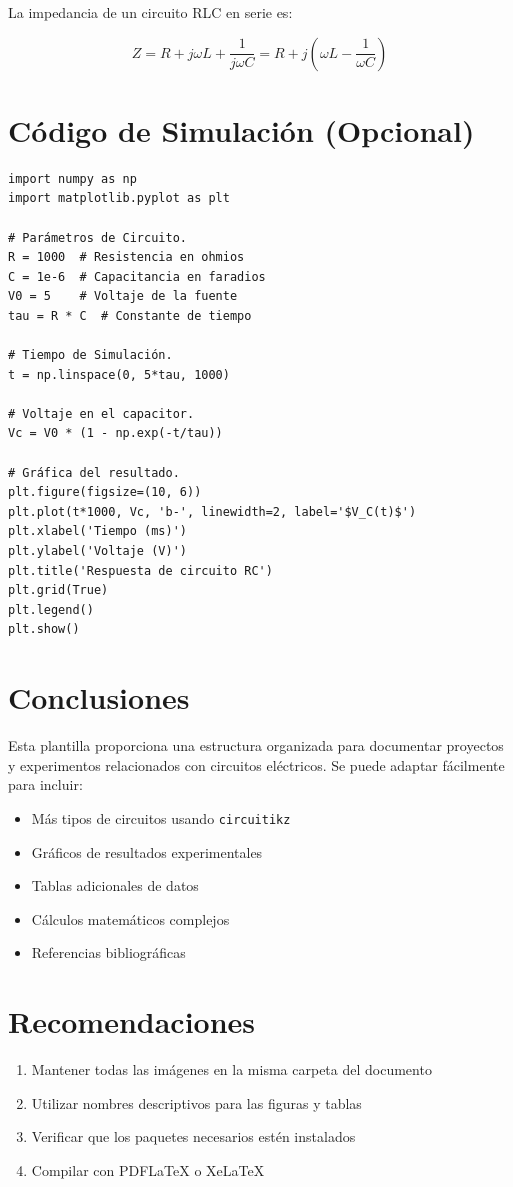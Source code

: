 \documentclass[a4paper, 12pt]{article}
\begin{document}
La impedancia de un circuito RLC en serie es:

\[
Z = R + j\omega L + \frac{1}{j\omega C} = R + j\left(\omega L - \frac{1}{\omega C}\right)
\]

\section{Código de Simulación (Opcional)}

\begin{lstlisting}[caption={Código Python para simulación de circuito RC}, label=lst:simulacion]
import numpy as np
import matplotlib.pyplot as plt

# Parámetros de Circuito.
R = 1000  # Resistencia en ohmios
C = 1e-6  # Capacitancia en faradios
V0 = 5    # Voltaje de la fuente
tau = R * C  # Constante de tiempo

# Tiempo de Simulación.
t = np.linspace(0, 5*tau, 1000)

# Voltaje en el capacitor.
Vc = V0 * (1 - np.exp(-t/tau))

# Gráfica del resultado.
plt.figure(figsize=(10, 6))
plt.plot(t*1000, Vc, 'b-', linewidth=2, label='$V_C(t)$')
plt.xlabel('Tiempo (ms)')
plt.ylabel('Voltaje (V)')
plt.title('Respuesta de circuito RC')
plt.grid(True)
plt.legend()
plt.show()
\end{lstlisting}

\section{Conclusiones}
Esta plantilla proporciona una estructura organizada para documentar proyectos y experimentos relacionados con circuitos eléctricos. Se puede adaptar fácilmente para incluir:
\begin{itemize}
    \item Más tipos de circuitos usando \texttt{circuitikz}
    \item Gráficos de resultados experimentales
    \item Tablas adicionales de datos
    \item Cálculos matemáticos complejos
    \item Referencias bibliográficas
\end{itemize}

\section*{Recomendaciones}
\begin{enumerate}
    \item Mantener todas las imágenes en la misma carpeta del documento
    \item Utilizar nombres descriptivos para las figuras y tablas
    \item Verificar que los paquetes necesarios estén instalados
    \item Compilar con PDFLaTeX o XeLaTeX
\end{enumerate}
\end{document}
